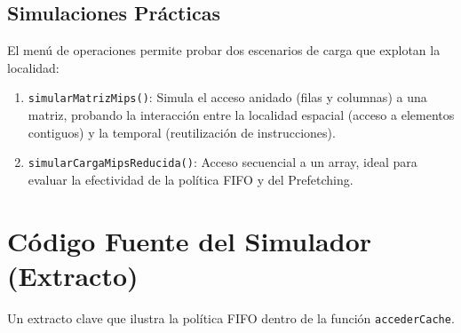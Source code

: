 \documentclass[12pt, a4paper]{article}
\begin{document}
\subsection{Simulaciones Prácticas}
El menú de operaciones permite probar dos escenarios de carga que explotan la localidad:
\begin{enumerate}
    \item \texttt{simularMatrizMips()}: Simula el acceso anidado (filas y columnas) a una matriz, probando la interacción entre la localidad espacial (acceso a elementos contiguos) y la temporal (reutilización de instrucciones).
    \item \texttt{simularCargaMipsReducida()}: Acceso secuencial a un array, ideal para evaluar la efectividad de la política FIFO y del Prefetching.
\end{enumerate}

\section{Código Fuente del Simulador (Extracto)}
\label{sec:codigo}

Un extracto clave que ilustra la política FIFO dentro de la función \texttt{accederCache}.


\end{document}
